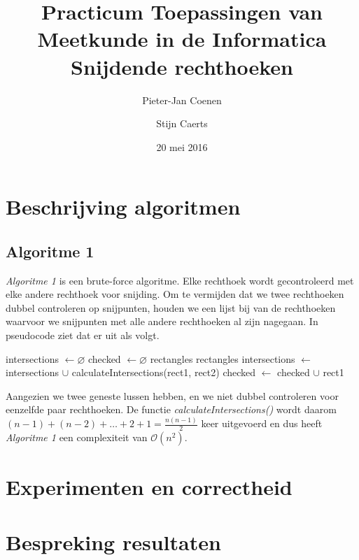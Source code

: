 \documentclass[11pt,a4paper,titlepage]{article}
\author{Pieter-Jan Coenen \and Stijn Caerts}
\title{Practicum Toepassingen van Meetkunde in de Informatica \\ Snijdende rechthoeken}
\date{20 mei 2016}
\begin{document}
	\maketitle
	\tableofcontents
	\newpage
	\section{Beschrijving algoritmen}
	\subsection{Algoritme 1}
	\emph{Algoritme 1} is een brute-force algoritme. Elke rechthoek wordt gecontroleerd met elke andere rechthoek voor snijding. Om te vermijden dat we twee rechthoeken dubbel controleren op snijpunten, houden we een lijst bij van de rechthoeken waarvoor we snijpunten met alle andere rechthoeken al zijn nagegaan. In pseudocode ziet dat er uit als volgt.
	\begin{algorithm}[H]
		\caption{}
		\begin{algorithmic}[1]
			\State intersections $\gets \varnothing $
			\State checked $\gets \varnothing $
			 {rectangles}
				 {rectangles}
						\State intersections $ \gets $ intersections $ \cup $ calculateIntersections(rect1, rect2)
					\EndIf
				\EndForEach
				\State checked $\gets$ checked $\cup$ rect1
			\EndForEach
		\end{algorithmic}
	\end{algorithm}
	Aangezien we twee geneste lussen hebben, en we niet dubbel controleren voor eenzelfde paar rechthoeken. De functie \emph{calculateIntersections()} wordt daarom $ (n-1) + (n-2) + \dots + 2 + 1 = \frac{n(n-1)}{2} $ keer uitgevoerd en dus heeft \emph{Algoritme 1} een complexiteit van $\mathcal{O}(n^2)$.
	
	\section{Experimenten en correctheid}
	\section{Bespreking resultaten}
	
\end{document}
